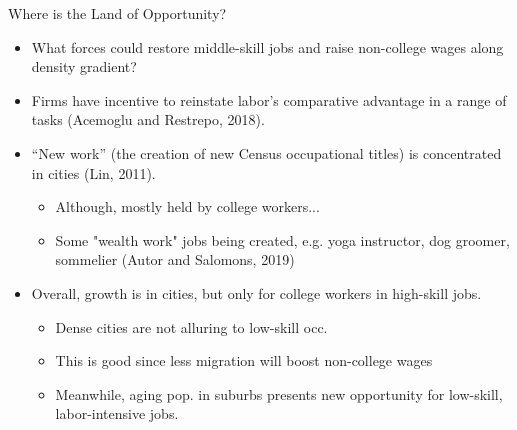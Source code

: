 \documentclass{beamer}
\begin{document}
\begin{frame}{Where is the Land of Opportunity?}

\begin{itemize}
	

	\item What forces could restore middle-skill jobs and raise non-college wages along density gradient?

	
	\bigskip
	
	\item Firms have incentive to reinstate labor’s comparative advantage in a range of tasks (Acemoglu and Restrepo, 2018).
	
	\bigskip
	
	\item “New work” (the creation of new Census occupational titles) is concentrated in cities (Lin, 2011).
	\begin{itemize}
		\item Although, mostly held by college workers...
		\item Some "wealth work" jobs being created, e.g. yoga instructor, dog groomer, sommelier (Autor and Salomons, 2019)
	\end{itemize}

	\bigskip
	
	\item Overall, growth is in cities, but only for college workers in high-skill jobs.
	\begin{itemize}
		\item Dense cities are not alluring to low-skill occ.
		\item This is good since less migration will boost non-college wages
		\item Meanwhile, aging pop. in suburbs presents new opportunity for low-skill, labor-intensive jobs.
	\end{itemize}

	
\end{itemize}

\end{frame}
\end{document}
